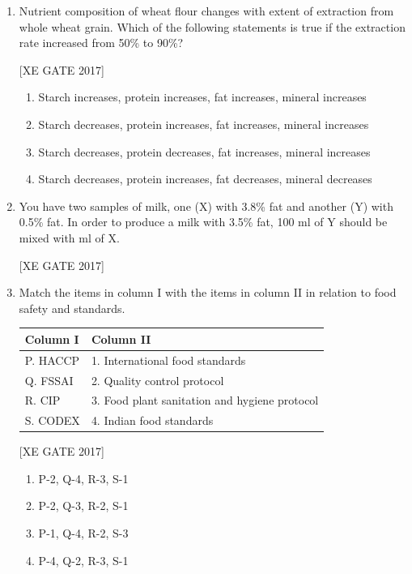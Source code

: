 \documentclass[journal,12pt,onecolumn]{IEEEtran}
\theoremstyle{remark}
\begin{document}
\begin{enumerate}
\item Nutrient composition of wheat flour changes with extent of extraction from whole wheat grain. Which of the following statements is true if the extraction rate increased from 50\% to 90\%?

\hfill [XE GATE 2017]


\begin{enumerate}
\item Starch increases, protein increases, fat increases, mineral increases
\item Starch decreases, protein increases, fat increases, mineral increases
\item Starch decreases, protein decreases, fat increases, mineral increases
\item Starch decreases, protein increases, fat decreases, mineral decreases
\end{enumerate}



\item You have two samples of milk, one (X) with 3.8\% fat and another (Y) with 0.5\% fat. In order to produce a milk with 3.5\% fat, 100 ml of Y should be mixed with \underline{\hspace{2cm}} ml of X.

\hfill [XE GATE 2017]

\item Match the items in column I with the items in column II in relation to food safety and standards.



\begin{tabular}{|l|l|}
\hline
\textbf{Column I} & \textbf{Column II} \\
\hline
P. HACCP & 1. International food standards \\
Q. FSSAI & 2. Quality control protocol \\
R. CIP & 3. Food plant sanitation and hygiene protocol \\
S. CODEX & 4. Indian food standards \\
\hline
\end{tabular}

\hfill [XE GATE 2017]

\begin{enumerate}
    \item P-2, Q-4, R-3, S-1
    \item P-2, Q-3, R-2, S-1
    \item P-1, Q-4, R-2, S-3
    \item P-4, Q-2, R-3, S-1
\end{enumerate}


\end{enumerate}
\end{document}
